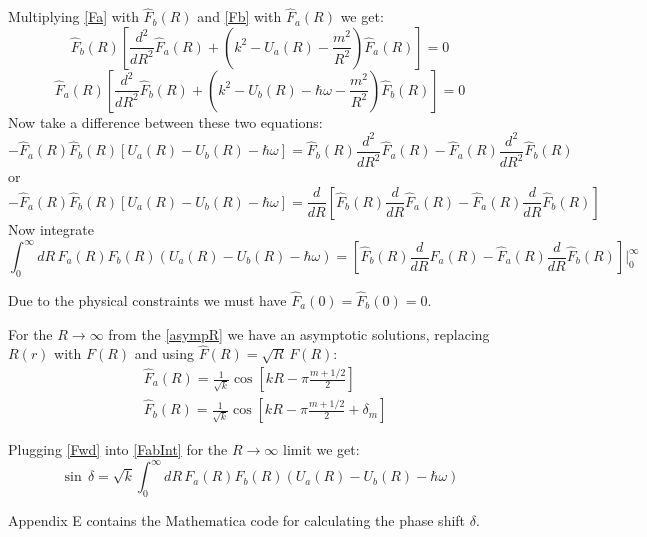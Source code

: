 Multiplying \eqref{Fa} with $ \hat{F}_b(R) $ and \eqref{Fb} with $ \hat{F}_a(R) $ we get:
\begin{equation}
\hat{F}_b(R)\left[\frac{d^2}{d R^2}\hat{F}_a(R) + \left(k^2 - U_a(R) - \frac{m^2}{R^2}\right)\hat{F}_a(R)\right] = 0
\end{equation}
\begin{equation}
\hat{F}_a(R)\left[\frac{d^2}{d R^2}\hat{F}_b(R) + \left(k^2 - U_b(R) -\hbar\omega - \frac{m^2}{R^2}\right)\hat{F}_b(R)\right] = 0
\end{equation}
Now take a difference between these two equations:
\begin{equation}
-\hat{F}_a(R)\hat{F}_b(R)\left[U_a(R) - U_b(R) - \hbar\omega\right] = \hat{F}_b(R)\frac{d^2}{d R^2}\hat{F}_a(R) - \hat{F}_a(R)\frac{d^2}{d R^2}\hat{F}_b(R)   
\end{equation}
or
\begin{equation}
-\hat{F}_a(R)\hat{F}_b(R)\left[U_a(R) - U_b(R) - \hbar\omega\right] = \frac{d}{dR}\left[\hat{F}_b(R)\frac{d}{d R}\hat{F}_a(R) - \hat{F}_a(R)\frac{d}{d R}\hat{F}_b(R) \right] 
\end{equation}
Now integrate 
\begin{equation}\label{FabInt}
\int_0^{\infty}{dR\,F_a(R)F_b(R)\left(U_a(R) - U_b(R) - \hbar\omega\right)} = 
\left[\hat{F}_b(R)\frac{d}{d R}\hat{F}_a(R) - \hat{F}_a(R)\frac{d}{d R}\hat{F}_b(R) \right]\Biggr|_0^{\infty} 
\end{equation}

Due to the physical constraints we must have $ \hat{F}_a(0) = \hat{F}_b(0) = 0 $.

For the $ R\rightarrow\infty $ from the \eqref{asympR} we have an asymptotic solutions, replacing $ R(r) $ with $ F(R) $ and using $ \hat{F}(R) = \sqrt{R}\,F(R) $:
\begin{equation}\label{Fwd}
\begin{split}
& \hat{F}_a(R) = \frac{1}{\sqrt{k}}\cos\left[kR-\pi\frac{m + 1/2}{2}\right] \\[.8em]
& \hat{F}_b(R) = \frac{1}{\sqrt{k}}\cos\left[kR-\pi\frac{m + 1/2}{2} + \delta_m\right]
\end{split}
\end{equation}

Plugging \eqref{Fwd} into \eqref{FabInt} for the $ R \rightarrow\infty $ limit we get:
\begin{equation}
\sin\,\delta = \sqrt{k}\int_0^{\infty}{dR\,F_a(R)F_b(R)\left(U_a(R) - U_b(R) - \hbar\omega\right)} 
\end{equation}

Appendix E contains the Mathematica code for calculating the phase shift $ \delta $.

